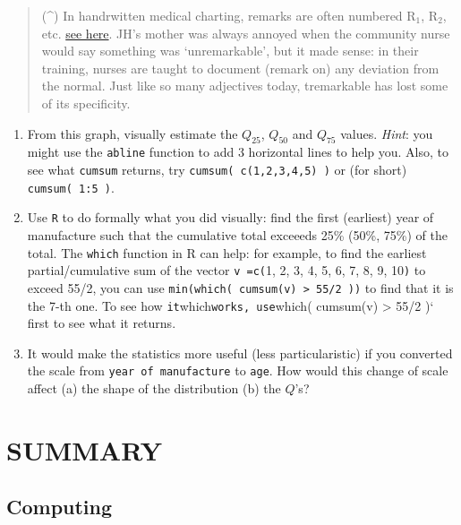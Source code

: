 \documentclass[]{book}
\begin{document}
\begin{quote}
(\^{}) In handrwitten medical charting, remarks are often numbered R\(_1\), R\(_2\), etc. \href{https://www.quora.com/In-medical-terminology-what-do-remarkable-and-unremarkable-mean}{see here}. JH's mother was always annoyed when the community nurse would say something was `unremarkable', but it made sense: in their training, nurses are taught to document (remark on) any deviation from the normal. Just like so many adjectives today, tremarkable has lost some of its specificity.
\end{quote}

\begin{enumerate}
\def\labelenumi{\arabic{enumi}.}
\setcounter{enumi}{3}
\item
  From this graph, visually estimate the \(Q_{25}\), \(Q_{50}\) and \(Q_{75}\) values. \emph{Hint}: you might use the \texttt{abline} function to add 3 horizontal lines to help you. Also, to see what \texttt{cumsum} returns, try \texttt{cumsum(\ c(1,2,3,4,5)\ )} or (for short) \texttt{cumsum(\ 1:5\ )}.
\item
  Use \texttt{R} to do formally what you did visually: find the first (earliest) year of manufacture such that the cumulative total exceeeds 25\% (50\%, 75\%) of the total. The \texttt{which} function in R
  can help: for example, to find the earliest partial/cumulative sum of the vector \texttt{v\ =c(}1, 2, 3, 4, 5, 6, 7, 8, 9, 10\texttt{)} to exceed 55/2, you can use \texttt{min(which(\ cumsum(v)\ \textgreater{}\ 55/2\ ))} to find that it is the
  7-th one. To see how \texttt{it}which\texttt{works,\ use}which( cumsum(v) \textgreater{} 55/2 )` first to see what it returns.
\item
  It would make the statistics more useful (less particularistic) if you converted the scale from \texttt{year\ of\ manufacture} to \texttt{age}. How would this change of scale affect (a) the shape of the distribution (b) the \(Q\)'s?
\end{enumerate}

\hypertarget{summary-2}{%
\section{SUMMARY}\label{summary-2}}

\hypertarget{computing}{%
\subsection{Computing}\label{computing}}
\end{document}
